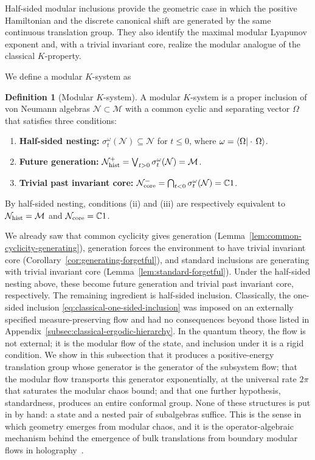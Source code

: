 \documentclass[a4paper,11pt]{article}
\theoremstyle{definition}
\newtheorem{definition}{Definition}[section]
\newcommand{\mN}{\mathcal{N}}
\newcommand{\mM}{\mathcal{M}}
\begin{document}
Half-sided modular inclusions provide the geometric case in which the
positive Hamiltonian and the discrete canonical shift are generated by
the same continuous translation group. They also identify the maximal
modular Lyapunov exponent and, with a trivial invariant core, realize
the modular analogue of the classical $K$-property.

We define a modular $K$-system as
\begin{definition}[Modular $K$-system]
\label{def:quantum-K-system}
A modular $K$-system is a proper inclusion of von Neumann algebras $\mN \subset \mM$ with a common cyclic and separating vector $\Omega$ that satisfies three conditions:
\begin{enumerate}
    \item \textbf{Half-sided nesting:} $\sigma^\omega_t(\mN) \subseteq \mN$ for $t \le 0$, where $\omega = \braket{\Omega | \cdot \, \Omega}$.
    \item \textbf{Future generation:} $\mN_{\rm hist}^{+}=\bigvee_{t>0}\sigma^\omega_t(\mN)=\mM$.
    \item \textbf{Trivial past invariant core:} $\mN_{\rm core}^{-}=\bigcap_{t<0}\sigma^\omega_t(\mN)=\mathbb C1$.
\end{enumerate}
By half-sided nesting, conditions (ii) and (iii) are respectively equivalent to $\mN_{\rm hist}=\mM$ and $\mN_{\rm core}=\mathbb C1$.
\end{definition}



We already saw that common cyclicity gives generation (Lemma~\ref{lem:common-cyclicity-generating}), generation forces the environment to have trivial invariant core (Corollary~\ref{cor:generating-forgetful}), and standard inclusions are generating with trivial invariant core (Lemma~\ref{lem:standard-forgetful}). Under the half-sided nesting above, these become future generation and trivial past invariant core, respectively. The remaining ingredient is half-sided inclusion. Classically, the one-sided inclusion \eqref{eq:classical-one-sided-inclusion} was imposed on an externally specified measure-preserving flow and had no consequences beyond those listed in Appendix~\ref{subsec:classical-ergodic-hierarchy}. In the quantum theory, the flow is not external; it is the modular flow of the state, and inclusion under it is a rigid condition. We show in this subsection that it produces a positive-energy translation group whose generator is the generator of the subsystem flow; that the modular flow transports this generator exponentially, at the universal rate $2\pi$ that saturates the modular chaos bound; and that one further hypothesis, standardness, produces an entire conformal group. None of these structures is put in by hand: a state and a nested pair of subalgebras suffice. This is the sense in which geometry emerges from modular chaos, and it is the operator-algebraic mechanism behind the emergence of bulk translations from boundary modular flows in holography~\cite{deBoerLamprou2020,LeutheusserLiu2023}.
\end{document}
